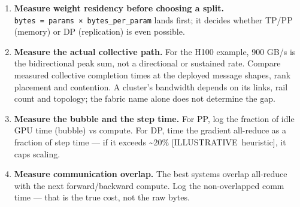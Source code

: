 \begin{enumerate}
\def\labelenumi{\arabic{enumi}.}
\item
  \textbf{Measure weight residency before choosing a split.}
  \texttt{bytes\ =\ params\ ×\ bytes\_per\_param} lands first; it
  decides whether TP/PP (memory) or DP (replication) is even possible.
\item
  \textbf{Measure the actual collective path.} For the H100 example, 900
  GB/s is the bidirectional peak sum, not a directional or sustained
  rate. Compare measured collective completion times at the deployed
  message shapes, rank placement and contention. A cluster's bandwidth
  depends on its links, rail count and topology; the fabric name alone
  does not determine the gap.
\item
  \textbf{Measure the bubble and the step time.} For PP, log the
  fraction of idle GPU time (bubble) vs compute. For DP, time the
  gradient all-reduce as a fraction of step time --- if it exceeds
  \textasciitilde20\% \mbox{{[}ILLUSTRATIVE heuristic{]}}, it caps scaling.
\item
  \textbf{Measure communication overlap.} The best systems overlap
  all-reduce with the next forward/backward compute. Log the
  non-overlapped comm time --- that is the true cost, not the raw bytes.
\end{enumerate}

\label{common-mistakes}


